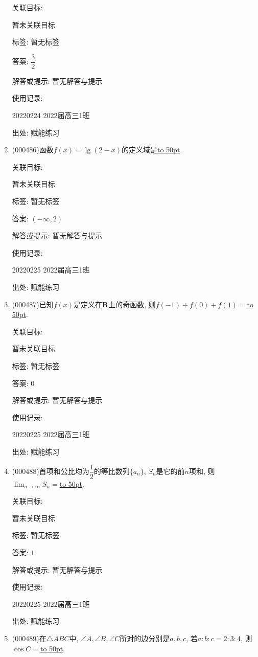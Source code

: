 \documentclass[10pt,a4paper]{article}
\newcommand{\blank}[1]{\underline{\hbox to #1pt{}}}
\begin{document}
\begin{enumerate}[1.]
关联目标:

暂未关联目标



标签: 暂无标签

答案: $\dfrac 32$

解答或提示: 暂无解答与提示

使用记录:

20220224	2022届高三1班	


出处: 赋能练习
\item { (000486)}函数$f(x)=\lg(2-x)$的定义域是\blank{50}.


关联目标:

暂未关联目标



标签: 暂无标签

答案: $(-\infty ,2)$

解答或提示: 暂无解答与提示

使用记录:

20220225	2022届高三1班	


出处: 赋能练习
\item { (000487)}已知$f(x)$是定义在$\mathbf{R}$上的奇函数, 则$f(-1)+f(0)+f(1)=$\blank{50}.


关联目标:

暂未关联目标



标签: 暂无标签

答案: $0$

解答或提示: 暂无解答与提示

使用记录:

20220225	2022届高三1班	


出处: 赋能练习
\item { (000488)}首项和公比均为$\dfrac12$的等比数列$\{a_n\}$, $S_n$是它的前$n$项和, 则$\displaystyle\lim_{n\to\infty}S_n=$\blank{50}.


关联目标:

暂未关联目标



标签: 暂无标签

答案: $1$

解答或提示: 暂无解答与提示

使用记录:

20220225	2022届高三1班	


出处: 赋能练习
\item { (000489)}在$\triangle ABC$中, $\angle A,\angle B,\angle C$所对的边分别是$a,b,c$, 若$a:b:c=2:3:4 $, 则$\cos C=$\blank{50}.



\end{enumerate}
\end{document}
